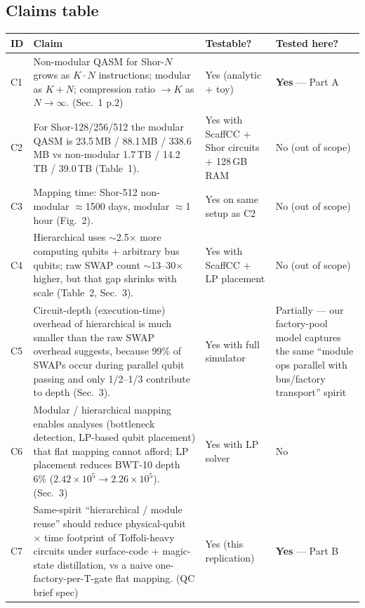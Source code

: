 \documentclass[11pt]{article}
\begin{document}
\subsection{Claims table}

\begin{longtable}{@{}p{}p{}p{}p{}@{}}
\toprule
\textbf{ID} & \textbf{Claim} & \textbf{Testable?} & \textbf{Tested here?} \\
\midrule
C1 & Non-modular QASM for Shor-$N$ grows as $K\cdot N$ instructions; modular as $K+N$; compression ratio $\to K$ as $N\to\infty$. (Sec.~1 p.2) & Yes (analytic + toy) & \textbf{Yes} --- Part A \\
\addlinespace
C2 & For Shor-128/256/512 the modular QASM is 23.5\,MB / 88.1\,MB / 338.6\,MB vs non-modular 1.7\,TB / 14.2\,TB / 39.0\,TB (Table~1). & Yes with ScaffCC + Shor circuits + 128\,GB RAM & No (out of scope) \\
\addlinespace
C3 & Mapping time: Shor-512 non-modular $\approx$1500 days, modular $\approx$1 hour (Fig.~2). & Yes on same setup as C2 & No (out of scope) \\
\addlinespace
C4 & Hierarchical uses $\sim$2.5$\times$ more computing qubits + arbitrary bus qubits; raw SWAP count $\sim$13--30$\times$ higher, but that gap shrinks with scale (Table~2, Sec.~3). & Yes with ScaffCC + LP placement & No (out of scope) \\
\addlinespace
C5 & Circuit-depth (execution-time) overhead of hierarchical is much smaller than the raw SWAP overhead suggests, because 99\% of SWAPs occur during parallel qubit passing and only 1/2--1/3 contribute to depth (Sec.~3). & Yes with full simulator & Partially --- our factory-pool model captures the same ``module ops parallel with bus/factory transport'' spirit \\
\addlinespace
C6 & Modular / hierarchical mapping enables analyses (bottleneck detection, LP-based qubit placement) that flat mapping cannot afford; LP placement reduces BWT-10 depth 6\% ($2.42\!\times\!10^5\to2.26\!\times\!10^5$). (Sec.~3) & Yes with LP solver & No \\
\addlinespace
C7 & Same-spirit ``hierarchical / module reuse'' should reduce physical-qubit $\times$ time footprint of Toffoli-heavy circuits under surface-code + magic-state distillation, vs a naive one-factory-per-T-gate flat mapping. (QC brief spec) & Yes (this replication) & \textbf{Yes} --- Part B \\
\bottomrule
\end{longtable}
\end{document}
